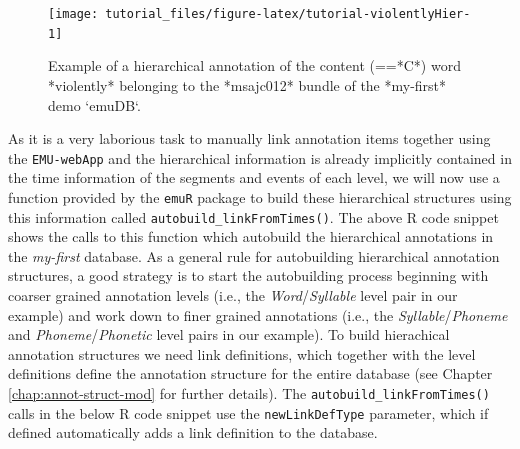 \documentclass[]{book}
\theoremstyle{definition}
\theoremstyle{definition}
\theoremstyle{definition}
\theoremstyle{remark}
\begin{document}
\begin{figure}

{\centering \texttt{[image: tutorial\_files/figure-latex/tutorial-violentlyHier-1]} 

}

\caption{Example of a hierarchical annotation of the content (==*C*) word *violently* belonging to the *msajc012* bundle of the *my-first* demo `emuDB`.}\label{fig:tutorial-violentlyHier}
\end{figure}

As it is a very laborious task to manually link annotation items
together using the \texttt{EMU-webApp} and the hierarchical information
is already implicitly contained in the time information of the segments
and events of each level, we will now use a function provided by the
\texttt{emuR} package to build these hierarchical structures using this
information called \texttt{autobuild\_linkFromTimes()}. The above R code
snippet shows the calls to this function which autobuild the
hierarchical annotations in the \emph{my-first} database. As a general
rule for autobuilding hierarchical annotation structures, a good
strategy is to start the autobuilding process beginning with coarser
grained annotation levels (i.e., the \emph{Word}/\emph{Syllable} level
pair in our example) and work down to finer grained annotations (i.e.,
the \emph{Syllable}/\emph{Phoneme} and \emph{Phoneme}/\emph{Phonetic}
level pairs in our example). To build hierachical annotation structures
we need link definitions, which together with the level definitions
define the annotation structure for the entire database (see Chapter
\ref{chap:annot-struct-mod} for further details). The
\texttt{autobuild\_linkFromTimes()} calls in the below R code snippet
use the \texttt{newLinkDefType} parameter, which if defined
automatically adds a link definition to the database.
\end{document}
